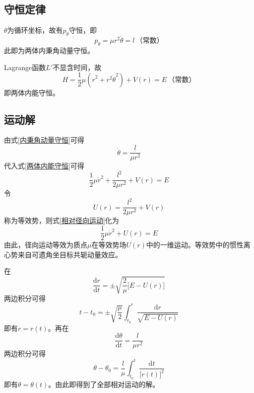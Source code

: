 \subsection{守恒定律}

$\theta$为循环坐标，故有$p_\theta$守恒，即
\begin{equation}
	p_\theta = \mu r^2 \dot{\theta} = l\,\text{（常数）}
	\label{内秉角动量守恒}
\end{equation}
此即为两体内秉角动量守恒。

Lagrange函数$L'$不显含时间，故
\begin{equation}
	H = \frac12 \mu \left(\dot{r}^2+r^2\dot{\theta}^2\right) + V(r) = E\,\text{（常数）}
	\label{两体内能守恒}
\end{equation}
即两体内能守恒。

\subsection{运动解}

由式\eqref{内秉角动量守恒}可得
\begin{equation*}
	\dot{\theta} = \frac{l}{\mu r^2}
\end{equation*}
代入式\eqref{两体内能守恒}可得
\begin{equation}
	\frac12 \mu \dot{r}^2 + \frac{l^2}{2\mu r^2} + V(r) = E
	\label{相对径向运动}
\end{equation}
令
\begin{equation}
	U(r) = \frac{l^2}{2\mu r^2} + V(r)
\end{equation}
称为{\heiti 等效势}，则式\eqref{相对径向运动}化为
\begin{equation}
	\frac12 \mu \dot{r}^2 + U(r) = E
	\label{两体运动等效为一维运动}
\end{equation}
由此，径向运动等效为质点$\mu$在等效势场$U(r)$中的一维运动。等效势中的惯性离心势来自可遗角坐目标共轭动量效应。

在
\begin{equation}
	\frac{\mathrm{d} r}{\mathrm{d} t} = \pm \sqrt{\frac{2}{\mu}\big[E-U(r)\big]}
	\label{r对t的方程}
\end{equation}
两边积分可得
\begin{equation}
	t-t_0 = \pm \sqrt{\frac{\mu}{2}} \int_{r_0}^r \frac{\mathrm{d} r}{\sqrt{E-U(r)}}
	\label{t与r的关系}
\end{equation}
即有$r = r(t)$。再在
\begin{equation}
	\frac{\mathrm{d} \theta}{\mathrm{d} t} = \frac{l}{\mu r^2}
	\label{theta对t的方程}
\end{equation}
两边积分可得
\begin{equation}
	\theta - \theta_0 = \frac{l}{\mu} \int_{t_0}^t \frac{\mathrm{d} t}{\big[r(t)\big]^2}
	\label{chp4:theta与t的关系}
\end{equation}
即有$\theta = \theta(t)$。由此即得到了全部相对运动的解。

